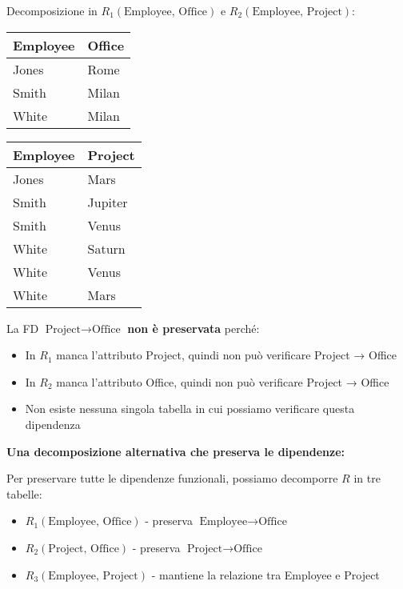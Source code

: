	\noindent Decomposizione in $R_1(\text{Employee, Office})$ e $R_2(\text{Employee, Project})$:
	\begin{center}
	\begin{tabular}{|l|l|}
		\hline
		\textbf{Employee} & \textbf{Office} \\ \hline
		Jones & Rome \\ \hline
		Smith & Milan \\ \hline
		White & Milan \\ \hline
	\end{tabular}
	\quad
	\begin{tabular}{|l|l|}
		\hline
		\textbf{Employee} & \textbf{Project} \\ \hline
		Jones & Mars \\ \hline
		Smith & Jupiter \\ \hline
		Smith & Venus \\ \hline
		White & Saturn \\ \hline
		White & Venus \\ \hline
		White & Mars \\ \hline
	\end{tabular}
	\end{center}

	\noindent La FD $\text{Project} \rightarrow \text{Office}$ \textbf{non è preservata} perché:
	\begin{itemize}
		\item In $R_1$ manca l'attributo Project, quindi non può verificare Project → Office
		\item In $R_2$ manca l'attributo Office, quindi non può verificare Project → Office
		\item Non esiste nessuna singola tabella in cui possiamo verificare questa dipendenza
	\end{itemize}
	
	\noindent \textbf{Una decomposizione alternativa che preserva le dipendenze:}
	
	Per preservare tutte le dipendenze funzionali, possiamo decomporre $R$ in tre tabelle:
	\begin{itemize}
		\item $R_1(\text{Employee, Office})$ - preserva $\text{Employee} \rightarrow \text{Office}$
		\item $R_2(\text{Project, Office})$ - preserva $\text{Project} \rightarrow \text{Office}$
		\item $R_3(\text{Employee, Project})$ - mantiene la relazione tra Employee e Project
	\end{itemize}

